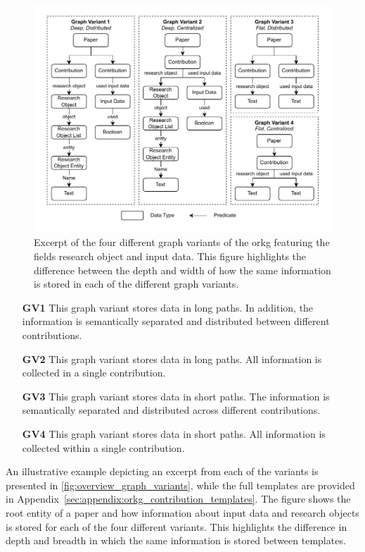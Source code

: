 \begin{figure}
    \centering
    \includegraphics[width=0.93\linewidth]{figures/orkg/template_overview-graph_variants.drawio.pdf}
    \caption[Overview of our Experimentation Graph Templates]{Excerpt of the four different graph variants of the \gls{orkg} featuring the fields research object and input data. This figure highlights the difference between the depth and width of how the same information is stored in each of the different graph variants.}
    \label{fig:overview_graph_variants}
\end{figure}

\begin{enumerate}[leftmargin=2.5em] 
    \item[\textbf{GV1}]\label{enum:gv1} This graph variant stores data in long paths. In addition, the information is semantically separated and distributed between different contributions. 
    \item[\textbf{GV2}]\label{enum:gv2} This graph variant stores data in long paths. All information is collected in a single contribution. 
    \item[\textbf{GV3}]\label{enum:gv3} This graph variant stores data in short paths. The information is semantically separated and distributed across different contributions. 
    \item[\textbf{GV4}]\label{enum:gv4} This graph variant stores data in short paths. All information is collected within a single contribution. 
\end{enumerate}

An illustrative example depicting an excerpt from each of the variants is presented in \autoref{fig:overview_graph_variants}, while the full templates are provided in Appendix~\ref{sec:appendix:orkg_contribution_templates}. The figure shows the root entity of a paper and how information about input data and research objects is stored for each of the four different variants. This highlights the difference in depth and breadth in which the same information is stored between templates.

